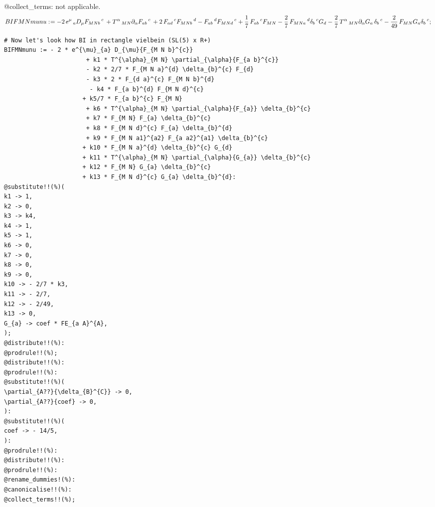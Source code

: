 \documentclass[11pt]{article}
\def\specialcolon{\mathrel{\mathop{:}}\hspace{-.5em}}
\begin{document}
@collect\_terms: not applicable.
\begin{dmath*}[compact, spread=2pt]
BIFMNmunu\specialcolon{}=  - 2\, {e}^{\mu}\,_{a} {D}_{\mu}{{F}_{M N b}\,^{c}}\,  + {T}^{\alpha}\,_{M N} {\partial}_{\alpha}{{F}_{a b}\,^{c}}\,  + 2\, {F}_{a d}\,^{c} {F}_{M N b}\,^{d} - {F}_{a b}\,^{d} {F}_{M N d}\,^{c} + \frac{1}{7}\, {F}_{a b}\,^{c} {F}_{M N} - \frac{2}{7}\, {F}_{M N a}\,^{d} {\delta}_{b}\,^{c} {G}_{d} - \frac{2}{7}\, {T}^{\alpha}\,_{M N} {\partial}_{\alpha}{{G}_{a}}\,  {\delta}_{b}\,^{c} - \frac{2}{49}\, {F}_{M N} {G}_{a} {\delta}_{b}\,^{c};
\end{dmath*}
{\color[named]{Blue}\begin{verbatim}
# Now let's look how BI in rectangle vielbein (SL(5) x R+)
BIFMNmunu := - 2 * e^{\mu}_{a} D_{\mu}{F_{M N b}^{c}}
                       + k1 * T^{\alpha}_{M N} \partial_{\alpha}{F_{a b}^{c}}
                       - k2 * 2/7 * F_{M N a}^{d} \delta_{b}^{c} F_{d}
                       - k3 * 2 * F_{d a}^{c} F_{M N b}^{d}
                        - k4 * F_{a b}^{d} F_{M N d}^{c}
                      + k5/7 * F_{a b}^{c} F_{M N}
                       + k6 * T^{\alpha}_{M N} \partial_{\alpha}{F_{a}} \delta_{b}^{c}
                       + k7 * F_{M N} F_{a} \delta_{b}^{c}
                       + k8 * F_{M N d}^{c} F_{a} \delta_{b}^{d}
                       + k9 * F_{M N a1}^{a2} F_{a a2}^{a1} \delta_{b}^{c}
                      + k10 * F_{M N a}^{d} \delta_{b}^{c} G_{d}
                      + k11 * T^{\alpha}_{M N} \partial_{\alpha}{G_{a}} \delta_{b}^{c}
                      + k12 * F_{M N} G_{a} \delta_{b}^{c}
                      + k13 * F_{M N d}^{c} G_{a} \delta_{b}^{d}:
@substitute!!(%)(
k1 -> 1,
k2 -> 0,
k3 -> k4,
k4 -> 1,
k5 -> 1,
k6 -> 0,
k7 -> 0,
k8 -> 0,
k9 -> 0,
k10 -> - 2/7 * k3,
k11 -> - 2/7,
k12 -> - 2/49,
k13 -> 0,
G_{a} -> coef * FE_{a A}^{A},
);
@distribute!!(%):
@prodrule!!(%);
@distribute!!(%):
@prodrule!!(%):
@substitute!!(%)(
\partial_{A??}{\delta_{B}^{C}} -> 0,
\partial_{A??}{coef} -> 0,
):
@substitute!!(%)(
coef -> - 14/5,
):
@prodrule!!(%):
@distribute!!(%):
@prodrule!!(%):
@rename_dummies!(%):
@canonicalise!!(%):
@collect_terms!!(%);
\end{verbatim}}
\end{document}
